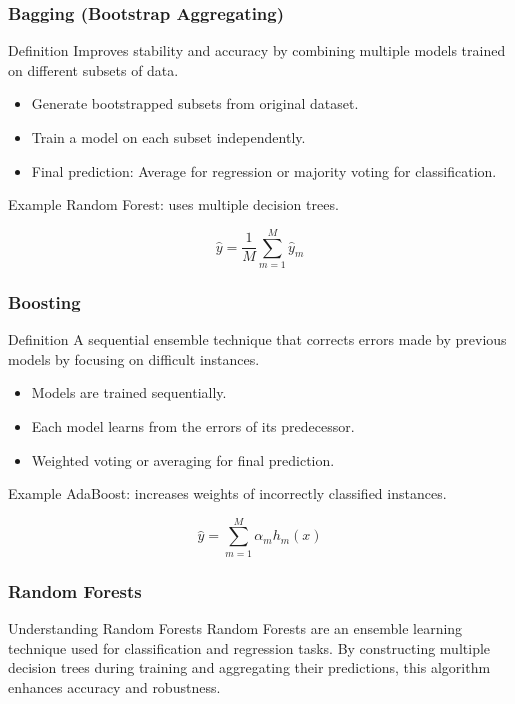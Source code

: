 \documentclass[aspectratio=169]{beamer}
\begin{document}
\begin{frame}[fragile]
    \frametitle{Bagging (Bootstrap Aggregating)}
    \begin{block}{Definition}
        Improves stability and accuracy by combining multiple models trained on different subsets of data.
    \end{block}
    \begin{itemize}
        \item Generate bootstrapped subsets from original dataset.
        \item Train a model on each subset independently.
        \item Final prediction: Average for regression or majority voting for classification.
    \end{itemize}
    \begin{block}{Example}
        Random Forest: uses multiple decision trees.
    \end{block}
    \begin{equation}
    \hat{y} = \frac{1}{M} \sum_{m=1}^{M} \hat{y}_m
    \end{equation}
\end{frame}

\begin{frame}[fragile]
    \frametitle{Boosting}
    \begin{block}{Definition}
        A sequential ensemble technique that corrects errors made by previous models by focusing on difficult instances.
    \end{block}
    \begin{itemize}
        \item Models are trained sequentially.
        \item Each model learns from the errors of its predecessor.
        \item Weighted voting or averaging for final prediction.
    \end{itemize}
    \begin{block}{Example}
        AdaBoost: increases weights of incorrectly classified instances.
    \end{block}
    \begin{equation}
    \hat{y} = \sum_{m=1}^{M} \alpha_m h_m(x)
    \end{equation}
\end{frame}

\begin{frame}[fragile]
    \frametitle{Random Forests}
    \begin{block}{Understanding Random Forests}
        Random Forests are an ensemble learning technique used for classification and regression tasks. 
        By constructing multiple decision trees during training and aggregating their predictions, this algorithm enhances accuracy and robustness. 
    \end{block}
\end{frame}
\end{document}
